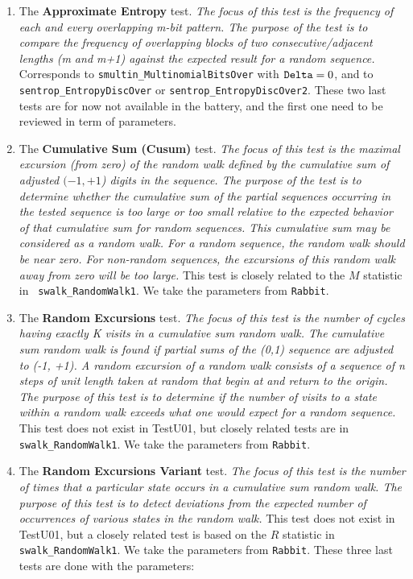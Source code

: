 \begin{enumerate}
\item The {\bf Approximate Entropy} test. \textit{The focus of this test is the
  frequency of each and every overlapping m-bit pattern. The purpose of the test
is to compare the frequency of overlapping blocks of two consecutive/adjacent
lengths (m and m+1) against the expected result for a random sequence.}
Corresponds to {\tt smultin\_MultinomialBitsOver} with ${\tt Delta} = 0$, and to
{\tt sentrop\_EntropyDiscOver} or  {\tt sentrop\_EntropyDiscOver2}. These two
last tests are for now not available in the battery, and the first one need to
be reviewed in term of parameters.

\item The {\bf Cumulative Sum (Cusum)} test. \textit{The focus of this test is
  the maximal excursion (from zero) of the random walk defined by the cumulative
sum of adjusted $(-1, +1$) digits in the sequence. The purpose of the test is to
determine whether the cumulative sum of the partial sequences occurring in the
tested sequence is too large or too small relative to the expected behavior of
that cumulative sum for random sequences. This cumulative sum may be considered
as a random walk. For a random sequence, the random walk should be near zero.
For non-random sequences, the excursions of this random walk away from zero will
be too large.} This test is  closely related to the $M$ statistic in  {\tt
swalk\_RandomWalk1}. We take the parameters from {\tt Rabbit}.

\item The {\bf Random Excursions} test. \textit{The focus of this test is the
  number of cycles having exactly K visits in a cumulative sum random walk. The
cumulative sum random walk is found if partial sums of the (0,1) sequence are
adjusted to (-1, +1). A random excursion of a random walk consists of a sequence
of n steps of unit length taken at random that begin at and return to the
origin. The purpose of this test is to determine if the number of visits to a
state within a random walk exceeds what one would expect for a random sequence.}
This test does not exist in TestU01, but closely related tests are in {\tt
swalk\_RandomWalk1}. We take the parameters from {\tt Rabbit}.

\item The {\bf Random Excursions Variant} test. \textit{The focus of this test
  is the number of times that a particular state occurs in a cumulative sum
random walk. The purpose of this test is to detect deviations from the expected
number of occurrences of various states in the random walk.} This test does not
exist in TestU01, but a closely related test is based on the $R$ statistic in
{\tt swalk\_RandomWalk1}. We take the parameters from {\tt Rabbit}. These three
last tests are done with the parameters:


\end{enumerate}
